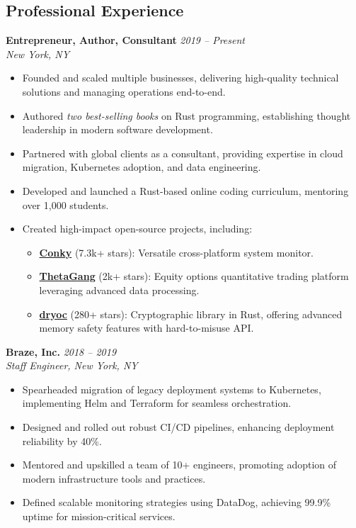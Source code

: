 \documentclass[margin,line]{resume}
\begin{document}
\begin{resume}
\vspace{10pt}

\section{Professional Experience}

\textbf{Entrepreneur, Author, Consultant} \hfill \textit{2019 -- Present} \\
\textit{New York, NY}
\begin{itemize}[leftmargin=0.5cm]
    \item Founded and scaled multiple businesses, delivering high-quality technical solutions and managing operations end-to-end.
    \item Authored \textit{two best-selling books} on Rust programming, establishing thought leadership in modern software development.
    \item Partnered with global clients as a consultant, providing expertise in cloud migration, Kubernetes adoption, and data engineering.
    \item Developed and launched a Rust-based online coding curriculum, mentoring over 1,000 students.
    \item Created high-impact open-source projects, including:
        \begin{itemize}
            \item \href{https://github.com/brndnmtthws/conky/}{\textbf{Conky}} (7.3k+ stars): Versatile cross-platform system monitor.
            \item \href{https://github.com/brndnmtthws/thetagang/}{\textbf{ThetaGang}} (2k+ stars): Equity options quantitative trading platform leveraging advanced data processing.
            \item \href{https://github.com/brndnmtthws/dryoc/}{\textbf{dryoc}} (280+ stars): Cryptographic library in Rust, offering advanced memory safety features with hard-to-misuse API.
        \end{itemize}
\end{itemize}

\textbf{Braze, Inc.} \hfill \textit{2018 -- 2019} \\
\textit{Staff Engineer, New York, NY}
\begin{itemize}[leftmargin=0.5cm]
    \item Spearheaded migration of legacy deployment systems to Kubernetes, implementing Helm and Terraform for seamless orchestration.
    \item Designed and rolled out robust CI/CD pipelines, enhancing deployment reliability by 40\%.
    \item Mentored and upskilled a team of 10+ engineers, promoting adoption of modern infrastructure tools and practices.
    \item Defined scalable monitoring strategies using DataDog, achieving 99.9\% uptime for mission-critical services.
\end{itemize}


\end{resume}
\end{document}

